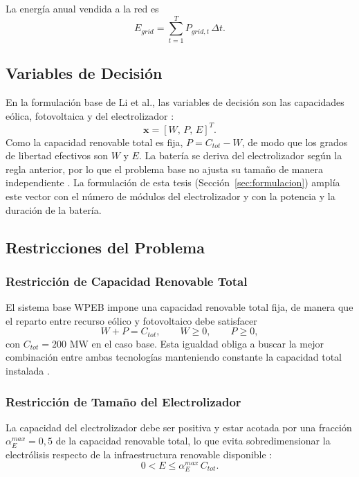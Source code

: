 La energía anual vendida a la red es
\begin{equation}
E_{grid}=\sum_{t=1}^{T}P_{grid,t}\,\Delta t.
\end{equation}

\subsection{Variables de Decisión}

En la formulación base de Li et al., las variables de decisión son las capacidades eólica, fotovoltaica y del electrolizador \cite{Li2024WPEB}:
\begin{equation}
\mathbf{x}=
\left[
W,\,
P,\,
E
\right]^T.
\end{equation}
Como la capacidad renovable total es fija, $P=C_{tot}-W$, de modo que los grados de libertad efectivos son $W$ y $E$. La batería se deriva del electrolizador según la regla anterior, por lo que el problema base no ajusta su tamaño de manera independiente \cite{Li2024WPEB}. La formulación de esta tesis (Sección~\ref{sec:formulacion}) amplía este vector con el número de módulos del electrolizador y con la potencia y la duración de la batería.

\subsection{Restricciones del Problema}

\subsubsection{Restricción de Capacidad Renovable Total}

El sistema base WPEB impone una capacidad renovable total fija, de manera que el reparto entre recurso eólico y fotovoltaico debe satisfacer
\begin{equation}
W+P=C_{tot},\qquad W\geq0,\qquad P\geq0,
\end{equation}
con $C_{tot}=200$ MW en el caso base. Esta igualdad obliga a buscar la mejor combinación entre ambas tecnologías manteniendo constante la capacidad total instalada \cite{Li2024WPEB}.

\subsubsection{Restricción de Tamaño del Electrolizador}

La capacidad del electrolizador debe ser positiva y estar acotada por una fracción $\alpha_E^{max}=0{,}5$ de la capacidad renovable total, lo que evita sobredimensionar la electrólisis respecto de la infraestructura renovable disponible \cite{Li2024WPEB}:
\begin{equation}
0<E\leq\alpha_E^{max}\,C_{tot}.
\end{equation}

